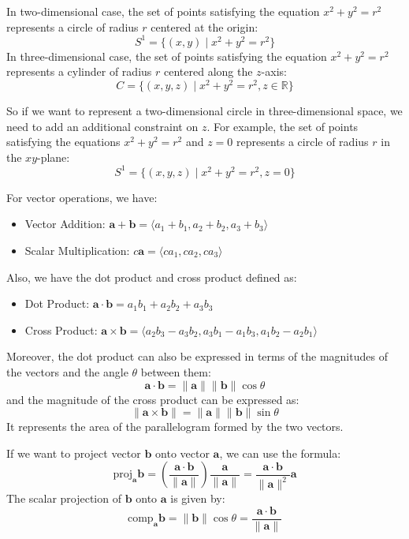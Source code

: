 \documentclass{book}
\theoremstyle{remark}
\begin{document}
In two-dimensional case, the set of points satisfying the equation $x^2 + y^2 = r^2$ represents a circle of radius $r$ centered at the origin:
\[
    S^1 = \{ (x, y) \mid x^2 + y^2 = r^2 \}
\]
In three-dimensional case, the set of points satisfying the equation $x^2 + y^2 = r^2$ represents a cylinder of radius $r$ centered along the $z$-axis:
\[
    C = \{ (x, y, z) \mid x^2 + y^2 = r^2, z \in \mathbb{R} \}
\]

So if we want to represent a two-dimensional circle in three-dimensional space, we need to add an additional constraint on $z$. For example, the set of points satisfying the equations $x^2 + y^2 = r^2$ and $z = 0$ represents a circle of radius $r$ in the $xy$-plane:
\[
    S^1 = \{ (x, y, z) \mid x^2 + y^2 = r^2, z = 0 \}
\]

For vector operations, we have:
\begin{itemize}
    \item Vector Addition: $\mathbf{a} + \mathbf{b} = \langle a_1 + b_1, a_2 + b_2, a_3 + b_3 \rangle$
    \item Scalar Multiplication: $c\mathbf{a} = \langle ca_1, ca_2, ca_3 \rangle$
\end{itemize}

Also, we have the dot product and cross product defined as:
\begin{itemize}
    \item Dot Product: $\mathbf{a} \cdot \mathbf{b} = a_1b_1 + a_2b_2 + a_3b_3$
    \item Cross Product: $\mathbf{a} \times \mathbf{b} = \langle a_2b_3 - a_3b_2, a_3b_1 - a_1b_3, a_1b_2 - a_2b_1 \rangle$
\end{itemize}

Moreover, the dot product can also be expressed in terms of the magnitudes of the vectors and the angle $\theta$ between them:
\[
    \mathbf{a} \cdot \mathbf{b} = \|\mathbf{a}\| \|\mathbf{b}\| \cos\theta
\]
and the magnitude of the cross product can be expressed as:
\[
    \|\mathbf{a} \times \mathbf{b}\| = \|\mathbf{a}\| \|\mathbf{b}\| \sin\theta
\]
It represents the area of the parallelogram formed by the two vectors.

If we want to project vector $\mathbf{b}$ onto vector $\mathbf{a}$, we can use the formula:
\[
    \text{proj}_{\mathbf{a}} \mathbf{b} = \left(\frac{\mathbf{a} \cdot \mathbf{b}}{\|\mathbf{a}\|}\right) \frac{\mathbf{a}}{\|\mathbf{a}\|} = \frac{\mathbf{a} \cdot \mathbf{b}}{\|\mathbf{a}\|^2} \mathbf{a}
\]
The scalar projection of $\mathbf{b}$ onto $\mathbf{a}$ is given by:
\[
    \text{comp}_{\mathbf{a}} \mathbf{b} = \|\mathbf{b}\| \cos\theta = \frac{\mathbf{a} \cdot \mathbf{b}}{\|\mathbf{a}\|}
\]
\end{document}
